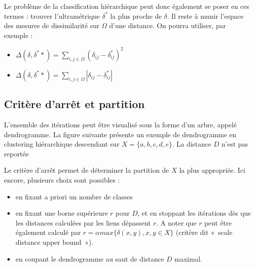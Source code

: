 \documentclass[letterpaper,10pt,french]{sphinxmanual}
\begin{document}
\sphinxAtStartPar
Le problème de la classification hiérarchique peut donc également se poser en ces termes : trouver l’ultramétrique \(\delta^*\) la plus proche de \(\delta\). Il reste à munir l’espace des mesures de dissimilarité sur  \(\Omega\) d’une distance. On pourra utiliser, par exemple :
\begin{itemize}
\item {} 
\sphinxAtStartPar
\(\Delta(\delta,\delta^**)=\displaystyle\sum_{i,j\in \Omega}(\delta_{ij}-\delta^*_{ij})^2\)

\item {} 
\sphinxAtStartPar
\(\Delta(\delta,\delta^**)=\displaystyle\sum_{i,j\in \Omega}|\delta_{ij}-\delta^*_{ij}|\)

\end{itemize}


\subsection{Critère d’arrêt et partition}
\label{\detokenize{clustering:critere-d-arret-et-partition}}
\ignorespaces 
\sphinxAtStartPar
L’ensemble des itérations peut être visualisé sous la forme d’un arbre, appelé dendrogramme. La figure suivante présente un exemple de dendrogramme en clustering hiérarchique descendant sur \(X = \{a, b, c, d, e\}\). La distance \(D\) n’est pas reportée

\sphinxAtStartPar
{}

\sphinxAtStartPar
Le critère d’arrêt permet de déterminer la partition  de \(X\) la plus appropriée. Ici encore, plusieurs choix sont possibles :
\begin{itemize}
\item {} 
\sphinxAtStartPar
en fixant a priori un nombre de classes

\item {} 
\sphinxAtStartPar
en fixant une borne supérieure \(r\) pour \(D\), et en stoppant les itérations dès que les distances calculées par les liens dépassent \(r\). A noter que \(r\) peut être également calculé par \(r=\alpha max\{\delta(x,y),x,y\in X\}\) (critère dit « scale distance upper bound »).

\item {} 
\sphinxAtStartPar
en coupant le dendrogramme au saut de distance \(D\) maximal.

\end{itemize}

\sphinxAtStartPar
{}
\end{document}
